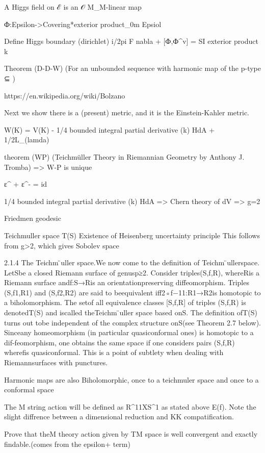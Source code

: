 A Higgs field on ℰ is an 𝒪 M_M-linear map

Ф:Epsilon->Covering*exterior product_0m Epsiol

Define Higgs boundary (dirichlet) 
i/2pi F nabla + [Ф,Ф^v] = SI exterior product k 

Theorem (D-D-W)  
(For an unbounded sequence with harmonic map of the p-type ⊆ )

https://en.wikipedia.org/wiki/Bolzano%

Next we show there is a (present) metric, and it is the Einstein-Kahler metric.

W(K) = V(K) - 1/4 bounded integral partial derivative (k) HdA + 1/2L_(lamda)    

theorem (WP)
(Teichmüller Theory in Riemannian Geometry by Anthony J. Tromba)
=> W-P is unique 

ε^ + ε^- = id 

 1/4 bounded integral partial derivative (k) HdA 
 => Chern theory of dV
 => g=2  
 
 Friedmen geodesic

 Teichmuller space T(S)
 Existence of Heisenberg uncertainty principle
 This follows from g>2, which gives Sobolev space
 
 2.1.4 The Teichm ̈uller space.We now come to the definition of Teichm ̈ullerspace. LetSbe a closed Riemann surface of genusp≥2. Consider triples(S,f,R), whereRis a Riemann surface andf:S→Ris an orientationpreserving diffeomorphism. Triples (S,f1,R1) and (S,f2,R2) are said to beequivalent iff2◦f−11:R1→R2is homotopic to a biholomorphism. The setof all equivalence classes [S,f,R] of triples (S,f,R) is denotedT(S) and iscalled theTeichm ̈uller space based onS. The definition ofT(S) turns out tobe independent of the complex structure onS(see Theorem 2.7 below). Sinceany homeomorphism (in particular quasiconformal ones) is homotopic to a dif-feomorphism, one obtains the same space if one considers pairs (S,f,R) wherefis quasiconformal. This is a point of subtlety when dealing with Riemannsurfaces with punctures.
 
 Harmonic maps are also 	Biholomorphic, once to a teichmuler space and once to a conformal space
 
 The M string action will be defined as R^11XS^1 as stated above E(f). Note the slight diffrence between a dimensional reduction and KK compatification.
 
 Prove that theM theory action given by TM space is well convergent and exactly findable.(comes from the epsilon+ term)
 
